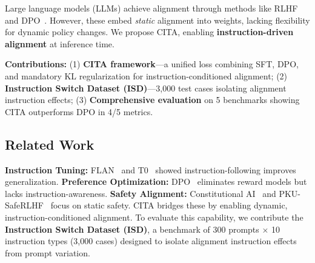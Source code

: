 
\label{sec:introduction}

Large language models (LLMs) achieve alignment through methods like RLHF~\cite{ouyang2022training} and DPO~\cite{rafailov2023direct}. However, these embed \textit{static} alignment into weights, lacking flexibility for dynamic policy changes. We propose CITA, enabling \textbf{instruction-driven alignment} at inference time.

\noindent\textbf{Contributions:} (1) \textbf{CITA framework}---a unified loss combining SFT, DPO, and mandatory KL regularization for instruction-conditioned alignment; (2) \textbf{Instruction Switch Dataset (ISD)}---3,000 test cases isolating alignment instruction effects; (3) \textbf{Comprehensive evaluation} on 5 benchmarks showing CITA outperforms DPO in 4/5 metrics.

\subsection{Related Work}

\textbf{Instruction Tuning:} FLAN~\cite{wei2022finetuned} and T0~\cite{sanh2022multitask} showed instruction-following improves generalization. \textbf{Preference Optimization:} DPO~\cite{rafailov2023direct} eliminates reward models but lacks instruction-awareness. \textbf{Safety Alignment:} Constitutional AI~\cite{bai2022constitutional} and PKU-SafeRLHF~\cite{ji2024pku} focus on static safety. CITA bridges these by enabling dynamic, instruction-conditioned alignment. To evaluate this capability, we contribute the \textbf{Instruction Switch Dataset (ISD)}, a benchmark of 300 prompts $\times$ 10 instruction types (3,000 cases) designed to isolate alignment instruction effects from prompt variation.
